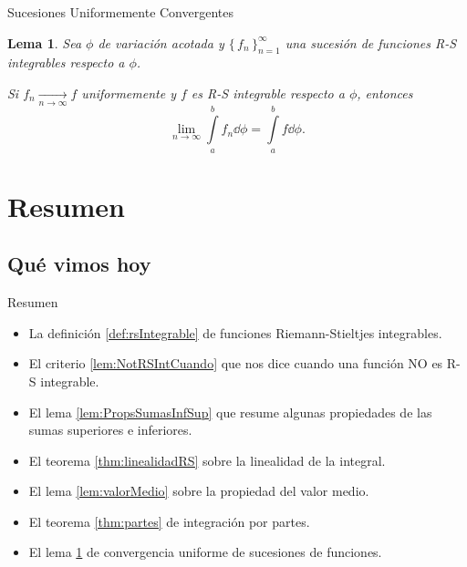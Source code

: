 \documentclass[utf8]{beamer}
\theoremstyle{plain}
\newtheorem{Lem}{Lema}                 %
\theoremstyle{definition}
\theoremstyle{remark}
\numberwithin{equation}{section}
\newcommand{\set}[1]{\{\,#1\,\}}    %
\newcommand{\sucn}{_{n=1}^\infty} %
\renewcommand{\.}{\Cdot}                %
\begin{document}
\begin{frame}{Sucesiones Uniformemente Convergentes}
  \begin{Lem}\label{lem:ConvUnifRS}
    Sea $\phi$ de variación acotada y $\set{f_n}\sucn$ una sucesión de funciones R-S integrables respecto a $\phi$.\par 
    Si $f_n\xrightarrow[n\to\infty]{}f$ uniformemente y $f$ es R-S integrable respecto a $\phi$, entonces
    $$\lim_{n\to\infty}\int\limits_a^bf_n\dd\phi=\int\limits_a^bf\dd\phi.$$
  \end{Lem}
\end{frame}
\section*{Resumen}

\subsection*{Qu\'e vimos hoy}

\begin{frame}{Resumen}

  \begin{itemize}
  \item La definición \ref{def:rsIntegrable} de funciones Riemann-Stieltjes integrables.
  \item El criterio \ref{lem:NotRSIntCuando} que nos dice cuando una función NO es R-S integrable.
  \item El lema \ref{lem:PropsSumasInfSup} que resume algunas propiedades de las sumas superiores e inferiores.
  \item El teorema \ref{thm:linealidadRS} sobre la linealidad de la integral.
  \item El lema \ref{lem:valorMedio} sobre la propiedad del valor medio.
  \item El teorema \ref{thm:partes} de integración por partes.
  \item El lema \ref{lem:ConvUnifRS} de convergencia uniforme de sucesiones de funciones.
  \end{itemize}
  
\end{frame}
\end{document}
